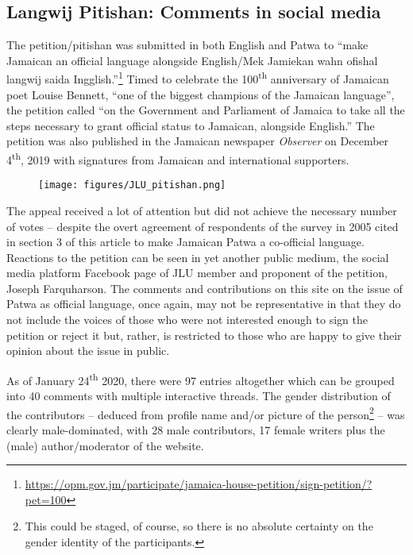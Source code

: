\documentclass[output=paper,colorlinks,citecolor=brown]{langscibook}
\begin{document}
\subsection{Langwij Pitishan: Comments in social media}\label{sec:muehleisen:4.2}

The petition/pitishan was submitted in both English and Patwa to “make Jamaican an official language alongside English\slash Mek Jamiekan wahn ofishal langwij saida Ingglish.”\footnote[2]{\url{https://opm.gov.jm/participate/jamaica-house-petition/sign-petition/?pet=100}} Timed to celebrate the 100\textsuperscript{th} anniversary of Jamaican poet Louise Bennett, “one of the biggest champions of the Jamaican language”, the petition called “on the Government and Parliament of Jamaica to take all the steps necessary to grant official status to Jamaican, alongside English.” The petition was also published in the Jamaican newspaper \textit{Observer} on December 4\textsuperscript{th}, 2019 with signatures from Jamaican and international supporters.

\begin{figure}
\texttt{[image: figures/JLU\_pitishan.png]}
 
\end{figure}
 

The appeal received a lot of attention but did not achieve the necessary number of votes -- despite the overt agreement of respondents of the survey in 2005 cited in section 3 of this article to make Jamaican Patwa a co-official language. Reactions to the petition can be seen in yet another public medium, the social media platform Facebook page of JLU member and proponent of the petition, Joseph Farquharson. The comments and contributions on this site on the issue of Patwa as official language, once again, may not be representative in that they do not include the voices of those who were not interested enough to sign the petition or reject it but, rather, is restricted to those who are happy to give their opinion about the issue in public.

As of January 24\textsuperscript{th} 2020, there were 97 entries altogether which can be grouped into 40 comments with multiple interactive threads. The gender distribution of the contributors -- deduced from profile name and/or picture of the person\footnote[3]{This could be staged, of course, so there is no absolute certainty on the gender identity of the participants.} -- was clearly male-dominated, with 28 male contributors, 17 female writers plus the (male) author\slash moderator of the website.
\end{document}
